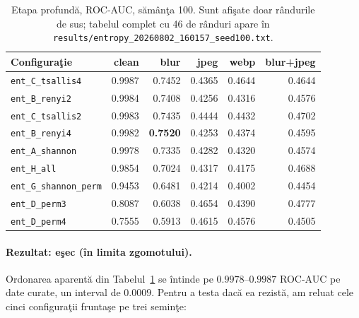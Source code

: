 \begin{table}[t]
  \centering
  \caption{Etapa profundă, ROC-AUC, sămânţa 100. Sunt afişate doar rândurile de
  sus; tabelul complet cu 46 de rânduri apare în
  \texttt{results/entropy\_20260802\_160157\_seed100.txt}.}
  \label{tab:entropy-deep}
  \begin{tabular}{lrrrrr}
    \toprule
    Configuraţie & clean & blur & jpeg & webp & blur+jpeg \\
    \midrule
    \texttt{ent\_C\_tsallis4}  & 0.9987 & 0.7452 & 0.4365 & 0.4644 & 0.4644 \\
    \texttt{ent\_B\_renyi2}    & 0.9984 & 0.7408 & 0.4256 & 0.4316 & 0.4576 \\
    \texttt{ent\_C\_tsallis2}  & 0.9983 & 0.7435 & 0.4444 & 0.4432 & 0.4702 \\
    \texttt{ent\_B\_renyi4}    & 0.9982 & \textbf{0.7520} & 0.4253 & 0.4374 & 0.4595 \\
    \texttt{ent\_A\_shannon}   & 0.9978 & 0.7335 & 0.4282 & 0.4320 & 0.4574 \\
    \midrule
    \texttt{ent\_H\_all}       & 0.9854 & 0.7024 & 0.4317 & 0.4175 & 0.4688 \\
    \texttt{ent\_G\_shannon\_perm} & 0.9453 & 0.6481 & 0.4214 & 0.4002 & 0.4454 \\
    \texttt{ent\_D\_perm3}     & 0.8087 & 0.6038 & 0.4654 & 0.4390 & 0.4777 \\
    \texttt{ent\_D\_perm4}     & 0.7555 & 0.5913 & 0.4615 & 0.4576 & 0.4505 \\
    \bottomrule
  \end{tabular}
\end{table}

\paragraph{Rezultat: eşec (în limita zgomotului).} Ordonarea aparentă din
Tabelul~\ref{tab:entropy-deep} se întinde pe $0.9978$--$0.9987$ ROC-AUC pe date
curate, un interval de $0.0009$. Pentru a testa dacă ea rezistă, am reluat cele
cinci configuraţii fruntaşe pe trei seminţe:

